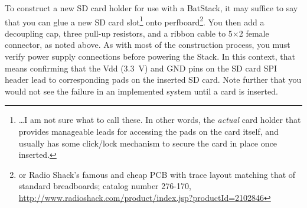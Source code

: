 \documentclass[letterpaper]{article}
\begin{document}
To construct a new SD card holder for use with a BatStack, it may
suffice to say that you can glue a new SD card slot\footnote{\ldots{}I
  am not sure what to call these. In other words, the \textit{actual}
  card holder that provides manageable leads for accessing the pads on
  the card itself, and usually has some click/lock mechanism to secure
  the card in place once inserted.} onto perfboard\footnote{or Radio
  Shack's famous and cheap PCB with trace layout matching that of
  standard breadboards; catalog number 276-170,
  \url{http://www.radioshack.com/product/index.jsp?productId=2102846}}. You
then add a decoupling cap, three pull-up resistors, and a ribbon cable
to 5$\times$2 female connector, as noted above. As with most of the
construction process, you must verify power supply connections before
powering the Stack. In this context, that means confirming that the
Vdd (3.3~V) and GND pins on the SD card SPI header lead to
corresponding pads on the inserted SD card. Note further that you
would not see the failure in an implemented system until a card is
inserted.
\end{document}
